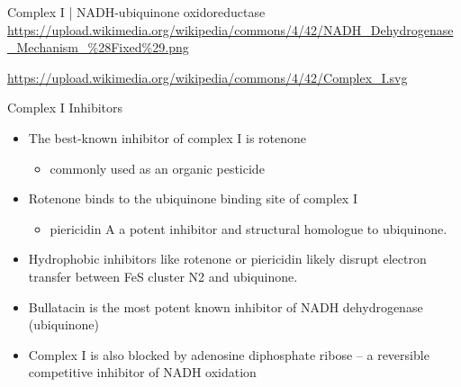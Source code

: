 \documentclass[presentation, smaller]{beamer}
\begin{document}
\begin{frame}[label={sec:orgca6c301}]{Complex I | NADH-ubiquinone oxidoreductase}
\url{https://upload.wikimedia.org/wikipedia/commons/4/42/NADH\_Dehydrogenase\_Mechanism\_\%28Fixed\%29.png}

\url{https://upload.wikimedia.org/wikipedia/commons/4/42/Complex\_I.svg}
\end{frame}
\begin{frame}[label={sec:org83bb6b0}]{Complex I Inhibitors}
\begin{itemize}
\item The best-known inhibitor of complex I is rotenone
\begin{itemize}
\item commonly used as an organic pesticide
\end{itemize}
\item Rotenone binds to the ubiquinone binding site of complex I
\begin{itemize}
\item piericidin A a potent inhibitor and structural homologue to ubiquinone.
\end{itemize}
\item Hydrophobic inhibitors like rotenone or piericidin likely disrupt electron transfer between FeS cluster N2 and ubiquinone.
\item Bullatacin is the most potent known inhibitor of NADH dehydrogenase (ubiquinone)
\item Complex I is also blocked by adenosine diphosphate ribose – a reversible competitive inhibitor of NADH oxidation
\end{itemize}
\end{frame}
\end{document}
